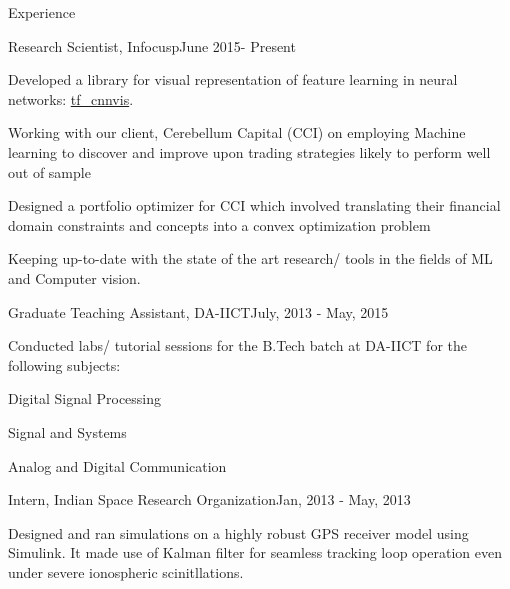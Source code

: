 \documentclass{resume} %
\begin{document}
	
	\begin{rSection}{Experience}
		
		\begin{rSubsection}{Research Scientist, Infocusp}{June 2015- Present}{}{}
			\item Developed a library for visual representation of feature learning  in neural networks: \href{https://github.com/InFoCusp/tf_cnnvis}{tf\_cnnvis}.
			\item Working with our client, Cerebellum Capital (CCI) on employing Machine learning to discover and improve upon trading strategies likely to perform well out of sample
			\item Designed a portfolio optimizer for CCI which involved translating their financial domain constraints and concepts into a convex optimization problem
			\item Keeping up-to-date with the state of the art research/ tools in the fields of ML and Computer vision.

		\end{rSubsection}
		
		
		
		\begin{rSubsection}{Graduate Teaching Assistant, DA-IICT}{July, 2013 - May, 2015}{}{}
			\item Conducted labs/ tutorial sessions for the B.Tech batch at DA-IICT for the following subjects:
			\item Digital Signal Processing 
			\item Signal and Systems
			\item Analog and Digital Communication
		\end{rSubsection}
		
			\begin{rSubsection}{Intern, Indian Space Research Organization}{Jan, 2013 - May, 2013}{}{}
				\item Designed and ran simulations on a highly robust GPS receiver model using Simulink. It made use of Kalman filter for seamless tracking loop operation even under severe ionospheric scinitllations. 
			\end{rSubsection}
	\end{rSection}
	
\end{document}
